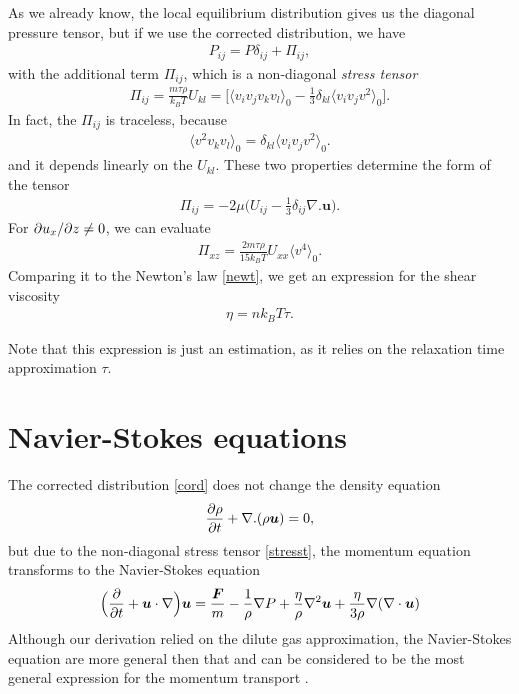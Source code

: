 As we already know, the local equilibrium distribution gives us the diagonal pressure tensor, but if we use the corrected distribution, we have
\begin{align}
P_{ij} = P \delta_{ij} + \Pi_{ij},
\end{align}
with the additional term $\Pi_{ij}$, which is a non-diagonal \textit{stress tensor}
\begin{align*}
\Pi_{ij} = \frac{m \tau \rho}{k_B T} U_{kl} = \Big[ \langle v_i v_j v_k v_l \rangle_0 - \frac{1}{3} \delta_{kl} \langle v_i v_j v^2 \rangle_0 \Big].
\end{align*}
In fact, the $\Pi_{ij}$ is traceless, because
\begin{align*}
\langle v^2 v_k v_l \rangle_0 = \delta_{kl} \langle v_i v_j v^2 \rangle_0. 
\end{align*}
and it depends linearly on the $U_{kl}$.
These two properties determine the form of the tensor
\begin{align} \label{stresst}
\Pi_{ij} = -2 \mu \big( U_{ij} - \frac{1}{3} \delta_{ij} \nabla . \bm{u} \big).
\end{align}
For $\partial u_x / \partial z \neq 0$, we can evaluate
\begin{align*}
\Pi_{xz} = \frac{2m\tau \rho}{15k_B T} U_{xx} \langle v^4 \rangle_0.
\end{align*}
Comparing it to the Newton's law \ref{newt}, we get an expression for the shear viscosity
\begin{align} \label{shearv}
\eta = n k_B T \tau.
\end{align}

Note that this expression is just an estimation, as it relies on the relaxation time approximation $\tau$.

\section{Navier-Stokes equations}

The corrected distribution \ref{cord} does not change the density equation
\begin{align*}
\frac{\partial \rho}{\partial t} + \nabla . (\rho \bm{u}) = 0,
\end{align*}
but due to the non-diagonal stress tensor \ref{stresst}, the momentum equation transforms to the Navier-Stokes equation
\begin{align}
\Big(\frac{\partial}{\partial t} + \bm{u} \cdot \nabla \Big) \bm{u} = \frac{\bm{F}}{m} - \frac{1}{\rho} \nabla P + \frac{\eta}{\rho} \nabla^2 \bm{u} + \frac{\eta}{3 \rho}\nabla(\nabla \cdot \bm{u})
\end{align}
Although our derivation relied on the dilute gas approximation, the Navier-Stokes equation are more general then that and can be considered to be the most general expression for the momentum transport \cite{tong}.

